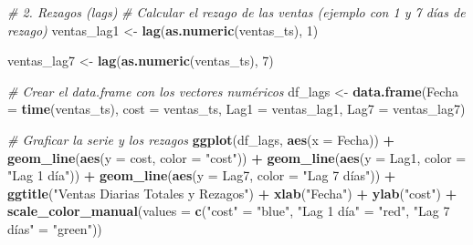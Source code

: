 \documentclass[
]{book}
\newenvironment{Shaded}{\begin{snugshade}}{\end{snugshade}}
\newcommand{\AttributeTok}[1]{\textcolor[rgb]{0.13,0.29,0.53}{#1}}
\newcommand{\CommentTok}[1]{\textcolor[rgb]{0.56,0.35,0.01}{\textit{#1}}}
\newcommand{\DecValTok}[1]{\textcolor[rgb]{0.00,0.00,0.81}{#1}}
\newcommand{\FunctionTok}[1]{\textcolor[rgb]{0.13,0.29,0.53}{\textbf{#1}}}
\newcommand{\NormalTok}[1]{#1}
\newcommand{\OtherTok}[1]{\textcolor[rgb]{0.56,0.35,0.01}{#1}}
\newcommand{\SpecialCharTok}[1]{\textcolor[rgb]{0.81,0.36,0.00}{\textbf{#1}}}
\newcommand{\StringTok}[1]{\textcolor[rgb]{0.31,0.60,0.02}{#1}}
\begin{document}
\begin{Shaded}
\begin{Highlighting}[]
\CommentTok{\# 2. Rezagos (lags)}
\CommentTok{\# Calcular el rezago de las ventas (ejemplo con 1 y 7 días de rezago)}
\NormalTok{ventas\_lag1 }\OtherTok{\textless{}{-}} \FunctionTok{lag}\NormalTok{(}\FunctionTok{as.numeric}\NormalTok{(ventas\_ts), }\DecValTok{1}\NormalTok{)}

\NormalTok{ventas\_lag7 }\OtherTok{\textless{}{-}} \FunctionTok{lag}\NormalTok{(}\FunctionTok{as.numeric}\NormalTok{(ventas\_ts), }\DecValTok{7}\NormalTok{)}


\CommentTok{\# Crear el data.frame con los vectores numéricos}
\NormalTok{df\_lags }\OtherTok{\textless{}{-}} \FunctionTok{data.frame}\NormalTok{(}\AttributeTok{Fecha =} \FunctionTok{time}\NormalTok{(ventas\_ts),}
                     \AttributeTok{cost =}\NormalTok{ ventas\_ts,}
                     \AttributeTok{Lag1 =}\NormalTok{ ventas\_lag1,}
                     \AttributeTok{Lag7 =}\NormalTok{ ventas\_lag7)}


\CommentTok{\# Graficar la serie y los rezagos}
\FunctionTok{ggplot}\NormalTok{(df\_lags, }\FunctionTok{aes}\NormalTok{(}\AttributeTok{x =}\NormalTok{ Fecha)) }\SpecialCharTok{+}
  \FunctionTok{geom\_line}\NormalTok{(}\FunctionTok{aes}\NormalTok{(}\AttributeTok{y =}\NormalTok{ cost, }\AttributeTok{color =} \StringTok{"cost"}\NormalTok{)) }\SpecialCharTok{+}
  \FunctionTok{geom\_line}\NormalTok{(}\FunctionTok{aes}\NormalTok{(}\AttributeTok{y =}\NormalTok{ Lag1, }\AttributeTok{color =} \StringTok{"Lag 1 día"}\NormalTok{)) }\SpecialCharTok{+}
  \FunctionTok{geom\_line}\NormalTok{(}\FunctionTok{aes}\NormalTok{(}\AttributeTok{y =}\NormalTok{ Lag7, }\AttributeTok{color =} \StringTok{"Lag 7 días"}\NormalTok{)) }\SpecialCharTok{+}
  \FunctionTok{ggtitle}\NormalTok{(}\StringTok{"Ventas Diarias Totales y Rezagos"}\NormalTok{) }\SpecialCharTok{+}
  \FunctionTok{xlab}\NormalTok{(}\StringTok{"Fecha"}\NormalTok{) }\SpecialCharTok{+} \FunctionTok{ylab}\NormalTok{(}\StringTok{"cost"}\NormalTok{) }\SpecialCharTok{+}
  \FunctionTok{scale\_color\_manual}\NormalTok{(}\AttributeTok{values =} \FunctionTok{c}\NormalTok{(}\StringTok{"cost"} \OtherTok{=} \StringTok{"blue"}\NormalTok{, }\StringTok{"Lag 1 día"} \OtherTok{=} \StringTok{"red"}\NormalTok{, }\StringTok{"Lag 7 días"} \OtherTok{=} \StringTok{"green"}\NormalTok{))}
\end{Highlighting}
\end{Shaded}
\end{document}
